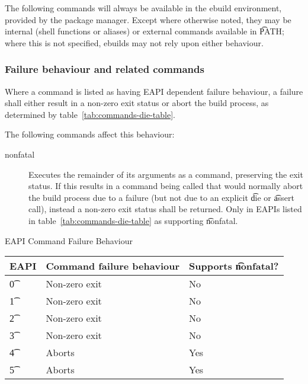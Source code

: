 \label{sec:pkg-mgr-commands}

The following commands will always be available in the ebuild environment, provided by the package
manager. Except where otherwise noted, they may be internal (shell functions or aliases) or external
commands available in \t{PATH}; where this is not specified, ebuilds may not rely upon either
behaviour.

\subsubsection{Failure behaviour and related commands}
\label{sec:failure-behaviour}

 Where a command is listed as having EAPI dependent failure behaviour,
a failure shall either result in a non-zero exit status or abort the build process, as determined by
table~\ref{tab:commands-die-table}.

The following commands affect this behaviour:
\begin{description}
\item[nonfatal]  Executes the remainder of its arguments as a command,
    preserving the exit status. If this results in a command being called that would normally abort
    the build process due to a failure (but not due to an explicit \t{die} or \t{assert} call),
    instead a non-zero exit status shall be returned. Only in EAPIs listed in
    table~\ref{tab:commands-die-table} as supporting \t{nonfatal}.
\end{description}

\begin{centertable}{EAPI Command Failure Behaviour} \label{tab:commands-die-table}
    \begin{tabular}{ l l l }
        \toprule
            \multicolumn{1}{c}{\textbf{EAPI}} &
            \multicolumn{1}{c}{\textbf{Command failure behaviour}} &
            \multicolumn{1}{c}{\textbf{Supports \t{nonfatal}?}} \\
            \midrule
    \t{0} & Non-zero exit & No \\
    \t{1} & Non-zero exit & No \\
    \t{2} & Non-zero exit & No \\
    \t{3} & Non-zero exit & No \\
    \t{4} & Aborts & Yes \\
    \t{5} & Aborts & Yes \\
    \bottomrule
    \end{tabular}
\end{centertable}

